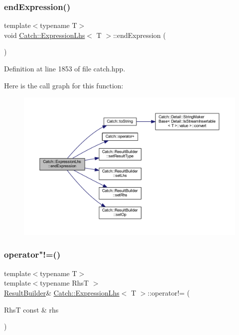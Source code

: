 \subsubsection{\texorpdfstring{end\+Expression()}{endExpression()}}
{\footnotesize\ttfamily template$<$typename T$>$ \\
void \hyperlink{class_catch_1_1_expression_lhs}{Catch\+::\+Expression\+Lhs}$<$ T $>$\+::end\+Expression (\begin{DoxyParamCaption}{ }\end{DoxyParamCaption})\hspace{0.3cm}{\ttfamily [inline]}}



Definition at line 1853 of file catch.\+hpp.

Here is the call graph for this function\+:\nopagebreak
\begin{figure}[H]
\begin{center}
\leavevmode
\includegraphics[width=350pt]{class_catch_1_1_expression_lhs_a13d2551a927790284fb5ddf1ee2c9079_cgraph}
\end{center}
\end{figure}
\hypertarget{class_catch_1_1_expression_lhs_a44df9974cf20fcfda4e5b6b3c01d5f93}{}\label{class_catch_1_1_expression_lhs_a44df9974cf20fcfda4e5b6b3c01d5f93} 
\subsubsection{\texorpdfstring{operator"!=()}{operator!=()}\hspace{0.1cm}{\footnotesize\ttfamily [1/2]}}
{\footnotesize\ttfamily template$<$typename T$>$ \\
template$<$typename RhsT $>$ \\
\hyperlink{class_catch_1_1_result_builder}{Result\+Builder}\& \hyperlink{class_catch_1_1_expression_lhs}{Catch\+::\+Expression\+Lhs}$<$ T $>$\+::operator!= (\begin{DoxyParamCaption}\item[{RhsT const \&}]{rhs }\end{DoxyParamCaption})\hspace{0.3cm}{\ttfamily [inline]}}



